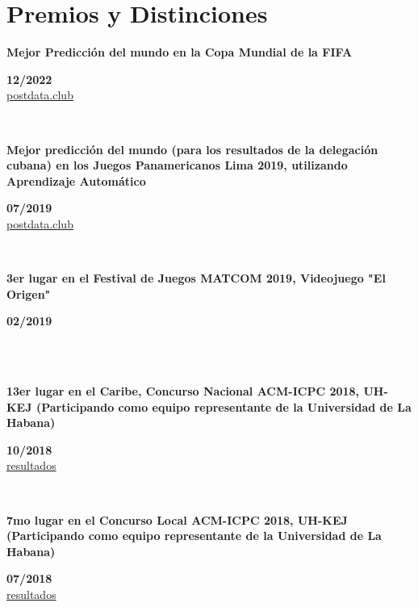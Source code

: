 \documentclass{article}
\begin{document}
\section*{Premios y Distinciones}
\begin{minipage}{0.8\textwidth}
\parbox{0.8\linewidth}{\textbf{Mejor Predicción del mundo en la Copa Mundial de la FIFA}} \hfill \textbf{12/2022}\\
\href{https://www.postdata.club/suplementos/mundial-qatar/pronosticando-qatar.html}{postdata.club}
\\
\end{minipage} \hfill {}\\
\begin{minipage}{0.8\textwidth}
\parbox{0.8\linewidth}{\textbf{Mejor predicción del mundo (para los resultados de la delegación cubana) en los Juegos Panamericanos Lima 2019, utilizando Aprendizaje Automático}} \hfill \textbf{07/2019}\\
\href{http://www.postdata.club/issues/201907/el-medallero-de-lima-2019-que-se-puede-esperar.html}{postdata.club}
\\
\end{minipage} \hfill {}\\
\begin{minipage}{0.8\textwidth}
\parbox{0.8\linewidth}{\textbf{3er lugar en el Festival de Juegos MATCOM 2019, Videojuego "El Origen"}} \hfill \textbf{02/2019}\\
\\
\end{minipage}\\
\begin{minipage}{0.8\textwidth}
\parbox{0.8\linewidth}{\textbf{13er lugar en el Caribe, Concurso Nacional ACM-ICPC 2018, UH-KEJ (Participando como equipo representante de la Universidad de La Habana)}} \hfill \textbf{10/2018}\\
\href{https://icpc.global/regionals/finder/cnc-2018/standings}{resultados}
\\
\end{minipage} \hfill {}\\
\begin{minipage}{0.8\textwidth}
\parbox{0.8\linewidth}{\textbf{7mo lugar en el Concurso Local ACM-ICPC 2018, UH-KEJ (Participando como equipo representante de la Universidad de La Habana)}} \hfill \textbf{07/2018}\\
\href{https://matcomgrader.com/post/5179/resultados-del-concurso-local-caribeno-2018}{resultados}
\\
\end{minipage} \hfill {}\\
\end{document}
